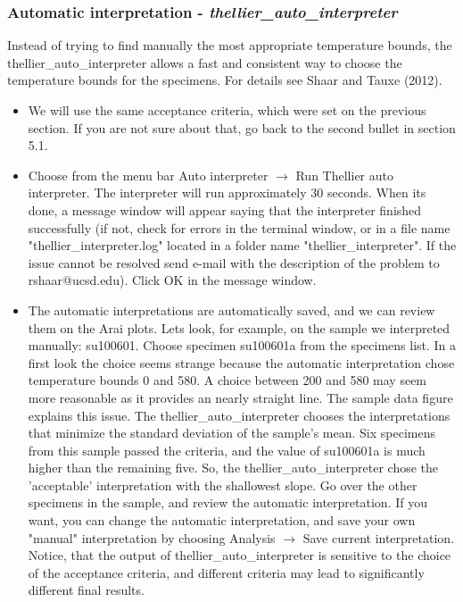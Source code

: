 \documentclass[12pt]{article}
\begin{document}
\subsubsection{Automatic interpretation - \it{thellier\_auto\_interpreter}}
Instead of trying to find manually the most appropriate temperature bounds, the  thellier\_auto\_interpreter allows a fast and consistent way to choose the temperature bounds for the specimens. For details see Shaar and Tauxe (2012). 
\begin{itemize}
\item We will use the same acceptance criteria, which were set on the previous section. If you are not sure about that, go back to the second bullet in section 5.1. 
\item Choose from the menu bar Auto interpreter $\rightarrow$ Run Thellier auto interpreter. The interpreter will run approximately 30 seconds. When its done, a message window will appear saying that the interpreter finished successfully (if not, check for errors in the terminal window, or in a file name "thellier\_interpreter.log"  located in a folder name "thellier\_interpreter". If the issue cannot be resolved send e-mail with the description of the problem to rshaar@ucsd.edu). Click OK in the message window.
\item The automatic interpretations are automatically saved, and we can review them on the Arai plots.  Lets look, for example, on the sample we interpreted  manually: su100601. Choose specimen su100601a from the specimens list. In a first look the choice seems strange because the automatic interpretation chose temperature bounds 0 and 580. A choice between 200 and 580 may seem more reasonable as it provides an nearly straight line. The sample data figure explains this issue. The thellier\_auto\_interpreter chooses the interpretations that minimize the standard deviation of the sample's mean. Six specimens from this sample passed the criteria, and the value of su100601a is much higher than the remaining five. So, the thellier\_auto\_interpreter chose the 'acceptable' interpretation with the shallowest  slope. Go over the other specimens in the sample, and review the automatic interpretation. If you want, you can change the automatic interpretation, and save your own "manual" interpretation by choosing Analysis $\rightarrow$ Save current interpretation. Notice, that the output of thellier\_auto\_interpreter is sensitive to the choice of the acceptance criteria, and different criteria may lead to significantly different final results. 
\end{itemize}
\end{document}
